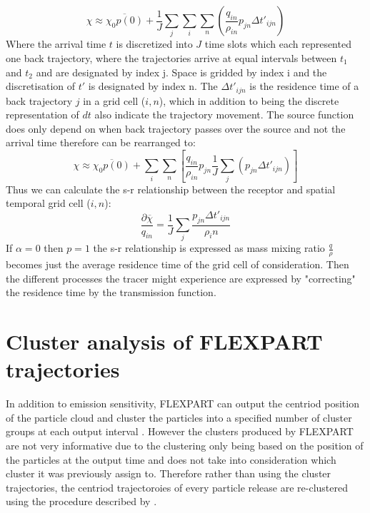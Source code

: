 \begin{equation}\label{eq:discrete_mix_ratio}
    \chi \approx \overline{\chi_0p(0)} + \frac{1}{J} \sum_j \sum_i \sum_n \left(\frac{q_{in}}{\rho_{in}}p_{jn}\Delta t'_{ijn}\right)
\end{equation}
Where the arrival time $t$ is discretized into $J$ time slots which each represented one back trajectory, where the trajectories arrive at equal intervals between $t_1$ and $t_2$ and are designated by index j. Space is gridded by index i and the discretisation of $t'$ is designated by index n. The $\Delta t'_{ijn}$ is the residence time of a back trajectory $j$ in a grid cell ($i,n$), which in addition to being the discrete representation of $dt$ also indicate the trajectory movement. The source function does only depend on when back trajectory passes over the source and not the arrival time therefore  can be rearranged to:
\begin{equation}
    \chi \approx \overline{\chi_0p(0)} + \sum_i \sum_n \left[\frac{q_{in}}{\rho_{in}}p_{jn} \frac{1}{J}\sum_j (p_{jn}\Delta t'_{ijn})\right]
\end{equation}
Thus we can calculate the s-r relationship between the receptor and spatial temporal grid cell ($i,n$):
\begin{equation}
    \frac{\partial \overline{\chi}}{q_{in}} = \frac{1}{J} \sum_j \frac{p_{jn} \Delta t'_{ijn}}{\rho_in}
\end{equation}
If $\alpha=0$ then $p=1$ the s-r relationship is expressed as mass mixing ratio $\frac{q}{\rho}$ becomes just the average residence time of the grid cell of consideration. Then the different processes the tracer might experience are expressed by "correcting" the residence time by the transmission function. 


\chapter{Cluster analysis of FLEXPART trajectories}

In addition to emission sensitivity, FLEXPART can output the centriod position of the particle cloud and cluster the particles into a specified number of cluster groups at each output interval \parencite{stohl_replacement_2002}. However the clusters produced by FLEXPART are not very informative due to the clustering only being based on the position of the particles at the output time and does not take into consideration which cluster it was previously assign to. Therefore rather than using the cluster trajectories, the centriod trajectoroies of every particle release are re-clustered using the procedure described by \textcite{dorling1992cluster}. 

